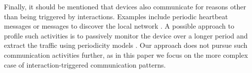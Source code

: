 Finally, it should be mentioned that devices also communicate for reasons other than being triggered by interactions. Examples include periodic heartbeat messages or messages to discover the local network \cite{mazhar_characterizing_2020, behaviot}. A possible approach to profile such activities is to passively monitor the device over a longer period and extract the traffic using periodicity models \cite{behaviot}.
Our approach does not pursue such communication activities further, as in this paper we focus on the more complex case of interaction-triggered communication patterns.





